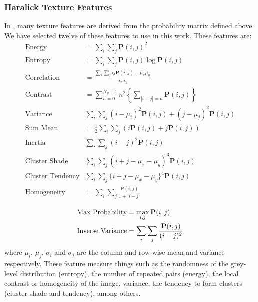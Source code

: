 \subsubsection{Haralick Texture Features}\label{sec:haralickFeatures}
In \cite{Haralick73,Haralick1992a}, many texture features are derived from the probability matrix defined above. We have selected twelve of these features to use in this work. These features are: 
\begin{align}\label{eq:energy}
\text{Energy} & = \sum\limits_i\sum\limits_j \mathbf{P}(i,j)^2\\ \label{eq:entropy}
\text{Entropy} & = \sum\limits_i\sum\limits_j \mathbf{P}(i,j) \log \mathbf{P}(i,j)\\\label{eq:correlation}
\text{Correlation} & = \frac{\sum_i\sum_j ij\mathbf{P}(i,j) - \mu_x\mu_y}{\sigma_x\sigma_y}\\\label{eq:contrastHar}
\text{Contrast} & = \sum\limits_{n=0}^{N_g-1} n^2 \left\lbrace\sum\limits_{|i-j|=n}\mathbf{P}(i,j)\right\rbrace  \\
\text{Variance} & \sum\limits_i\sum\limits_j (i-\mu_i)^2 \mathbf{P}(i,j)+ (j-\mu_j)^2\mathbf{P}(i,j)\\
\text{Sum Mean} & = \frac{1}{2} \sum\limits_i\sum\limits_j(i\mathbf{P}(i,j)+j\mathbf{P}(i,j))\\
\text{Inertia} & \sum\limits_i\sum\limits_j (i-j)^2\mathbf{P}(i,j)\\
\text{Cluster Shade} & \sum\limits_i\sum\limits_j (i+j-\mu_x-\mu_y)^3 \mathbf{P}(i,j)\\
\text{Cluster Tendency} & \sum\limits_i\sum\limits_j \{ i+j-\mu_x-\mu_y\}^4 \mathbf{P}(i,j)\\\label{eq:homogeneity}
\text{Homogeneity} & = \sum\limits_i\sum\limits_j \frac{\mathbf{P}(i,j)}{1+|i-j|}\\
\end{align}
\begin{align}
\text{Max Probability} & = \max_{i,j} \mathbf{P}(i,j)\\
\text{Inverse Variance} & = \sum\limits_i\sum\limits_j {\mathbf{P}(i,j) \over (i-j)^2}
\end{align}
where $\mu_i$, $\mu_j$, $\sigma_i$ and $\sigma_j$ are the column and row-wise mean and variance respectively. These feature measure things such as the randomness of the grey-level distribution (entropy), the number of repeated pairs (energy), the local contrast or homogeneity of the image, variance, the tendency to form clusters (cluster shade and tendency), among others. 

